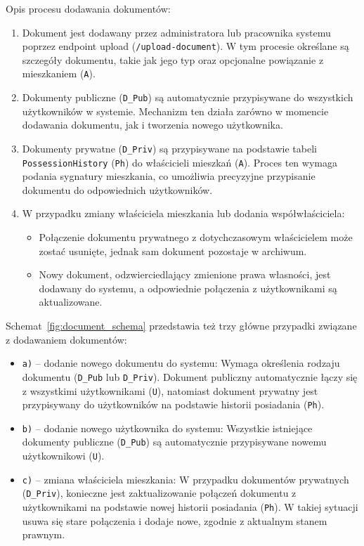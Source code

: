 Opis procesu dodawania dokumentów:
\begin{enumerate}
    \item Dokument jest dodawany przez administratora lub pracownika systemu poprzez endpoint upload (\texttt{/upload-document}). W tym procesie określane są szczegóły dokumentu, takie jak jego typ oraz opcjonalne powiązanie z mieszkaniem (\texttt{A}).
    \item Dokumenty publiczne (\texttt{D\_Pub}) są automatycznie przypisywane do wszystkich użytkowników w systemie. Mechanizm ten działa zarówno w momencie dodawania dokumentu, jak i tworzenia nowego użytkownika.
    \item Dokumenty prywatne (\texttt{D\_Priv}) są przypisywane na podstawie tabeli \texttt{PossessionHistory} (\texttt{Ph}) do właścicieli mieszkań (\texttt{A}). Proces ten wymaga podania sygnatury mieszkania, co umożliwia precyzyjne przypisanie dokumentu do odpowiednich użytkowników.
    \item W przypadku zmiany właściciela mieszkania lub dodania współwłaściciela:
    \begin{itemize}
        \item Połączenie dokumentu prywatnego z dotychczasowym właścicielem może zostać usunięte, jednak sam dokument pozostaje w archiwum.
        \item Nowy dokument, odzwierciedlający zmienione prawa własności, jest dodawany do systemu, a odpowiednie połączenia z użytkownikami są aktualizowane.
    \end{itemize}
\end{enumerate}

\noindent Schemat~\ref{fig:document_schema} przedstawia też trzy główne przypadki związane z dodawaniem dokumentów:
\begin{itemize}
    \item \texttt{a)} -- dodanie nowego dokumentu do systemu: Wymaga określenia rodzaju dokumentu (\texttt{D\_Pub} lub \texttt{D\_Priv}). Dokument publiczny automatycznie łączy się z wszystkimi użytkownikami (\texttt{U}), natomiast dokument prywatny jest przypisywany do użytkowników na podstawie historii posiadania (\texttt{Ph}).
    \item \texttt{b)} -- dodanie nowego użytkownika do systemu: Wszystkie istniejące dokumenty publiczne (\texttt{D\_Pub}) są automatycznie przypisywane nowemu użytkownikowi (\texttt{U}).
    \item \texttt{c)} -- zmiana właściciela mieszkania: W przypadku dokumentów prywatnych (\texttt{D\_Priv}), konieczne jest zaktualizowanie połączeń dokumentu z użytkownikami na podstawie nowej historii posiadania (\texttt{Ph}). W takiej sytuacji usuwa się stare połączenia i dodaje nowe, zgodnie z aktualnym stanem prawnym.
\end{itemize}

